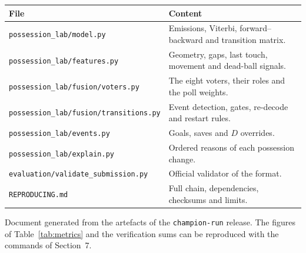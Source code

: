 \documentclass[10pt,a4paper]{article}
\newcommand{\code}[1]{\texttt{\small #1}}
\begin{document}
\begin{center}
\footnotesize
\begin{tabularx}{\textwidth}{@{}>{\raggedright\arraybackslash}p{6.1cm}X@{}}
\toprule
File & Content \\
\midrule
\code{possession\_lab/model.py} & Emissions, Viterbi, forward--backward and transition matrix. \\
\code{possession\_lab/features.py} & Geometry, gaps, last touch, movement and dead-ball signals. \\
\code{possession\_lab/fusion/voters.py} & The eight voters, their roles and the poll weights. \\
\code{possession\_lab/fusion/transitions.py} & Event detection, gates, re-decode and restart rules. \\
\code{possession\_lab/events.py} & Goals, saves and $D$ overrides. \\
\code{possession\_lab/explain.py} & Ordered reasons of each possession change. \\
\code{evaluation/validate\_submission.py} & Official validator of the format. \\
\code{REPRODUCING.md} & Full chain, dependencies, checksums and limits. \\
\bottomrule
\end{tabularx}
\end{center}

\vspace{2pt}
{\footnotesize\color{slate}Document generated from the artefacts of the
\texttt{champion-run} release. The figures of Table~\ref{tab:metrics} and the verification
sums can be reproduced with the commands of Section~7.}
\end{document}
